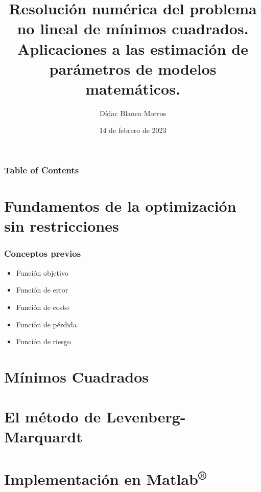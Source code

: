 \documentclass{beamer}
\title
{Resolución numérica del problema no lineal de mínimos cuadrados.
Aplicaciones a las estimación de parámetros de modelos matemáticos.}
\author
{Dídac Blanco Morros}
\date
{14 de febrero de 2023}
\begin{document}
\frame{\titlepage}

\begin{frame}
\frametitle{Table of Contents} %
\tableofcontents
\end{frame}

\section{Fundamentos de la optimización sin restricciones}
\begin{frame}
    \frametitle{Conceptos previos}
    \begin{itemize}
        \item Función objetivo
        \item Función de error
        \item Función de costo
        \item Función de pérdida
        \item Función de riesgo
    \end{itemize}
\end{frame}

\section{Mínimos Cuadrados}


\section{El método de Levenberg-Marquardt}


\section{Implementación en Matlab\textsuperscript{®}}
\end{document}
